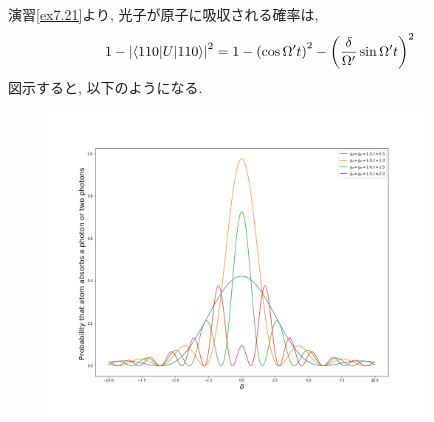 \begin{ex}
    \label{ex7.22}
    演習\ref{ex7.21}より, 光子が原子に吸収される確率は,
    \begin{align*}
        1 - \left| \braket{110|U|110}\right|^2
        =  1 - \left(\cos\Omega' t\right)^2 - \left(\frac{\delta}{\Omega'} \sin\Omega't \right)^2
    \end{align*}
    図示すると, 以下のようになる.
    \begin{figure}[H]
        \begin{center}
            \includegraphics[width = 100mm]{./fig/ex7_22.png}
        \end{center}
    \end{figure}
\end{ex}

\begin{ex}
    \label{ex7.23}
\end{ex}